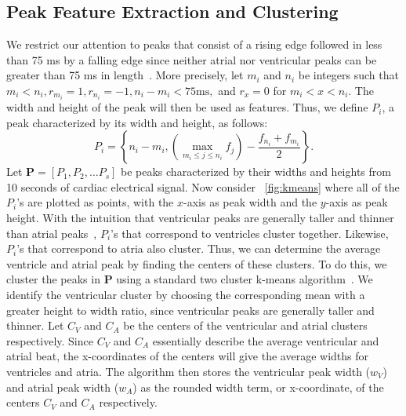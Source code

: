 \documentclass[conference]{IEEEtran}
\newcommand{\APW}{\ensuremath{w_A}}
\newcommand{\VPW}{\ensuremath{w_V}}
\begin{document}
\subsection{Peak Feature Extraction and Clustering}
We restrict our attention to peaks that consist of a rising edge
followed in less than 75 ms by a falling edge since 
neither atrial nor ventricular peaks can be greater than 75 ms in length~\cite{cardiac-cycle}.
More precisely, let $m_i$ and $n_i$ be integers such that $m_i < n_i, r_{m_i}=1, r_{n_i} = -1, n_i-m_i < 75 \text{ms},$ and $r_x=0 $ for $m_i < x < n_i$.
The width and height of the peak will then be used as features.  Thus, we define $P_i$, a peak characterized by its width and height, as follows:
\begin{equation*}
	P_i = \left\{n_i-m_i, \left( \max\limits_{m_i\le j\le n_i} f_j \right) - \frac{f_{n_i}+f_{m_i}}{2} \right\}.
\end{equation*}
Let $\mathbf{P} = [P_1, P_2, \dots P_s]$ be peaks characterized by their widths and heights from 10 seconds of cardiac electrical signal.
Now consider \figurename~\ref{fig:kmeans} where all of the $P_i$'s are plotted as points, with the $x$-axis as peak width and the $y$-axis as peak height.
With the intuition that ventricular peaks are generally taller and thinner than atrial peaks~\cite{cardiac-cycle},
$P_i$'s that correspond to ventricles cluster together.  Likewise, $P_i$'s that correspond to atria also cluster.
Thus, we can determine the average ventricle and atrial peak by finding the centers of these clusters.  To do this,
we cluster the peaks in $\mathbf{P}$ using a standard two cluster k-means algorithm~\cite{k-means}.  
We identify the ventricular cluster by choosing the corresponding mean 
with a greater height to width ratio, since
ventricular peaks are generally taller and thinner. Let $C_V$ and $C_A$
be the centers of the ventricular and atrial clusters 
respectively. Since $C_V$ and $C_A$ essentially describe the average ventricular and atrial beat, the x-coordinates of the centers will give the average widths for ventricles and atria. The algorithm then stores the ventricular
peak width (\VPW) and atrial peak width (\APW) as the
rounded width term, or x-coordinate, of the centers $C_V$ and $C_A$ respectively.
\end{document}
